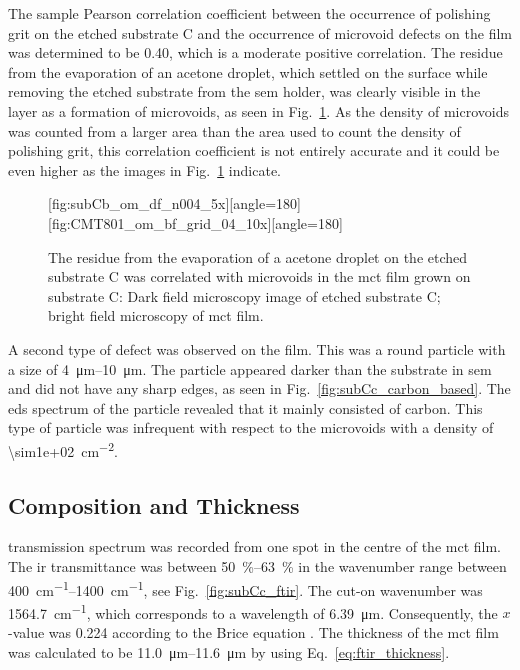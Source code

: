 The sample Pearson correlation coefficient between the occurrence of polishing grit on the etched substrate C and the occurrence of microvoid defects on the film was determined to be \SI{0.40}{}, which is a moderate positive correlation. The residue from the evaporation of an acetone droplet, which settled on the surface while removing the etched substrate from the \ac{sem} holder, was clearly visible in the layer as a formation of microvoids, as seen in Fig.~\ref{fig:subCc_microvoids_correlation}. As the density of microvoids was counted from a larger area than the area used to count the density of polishing grit, this correlation coefficient is not entirely accurate and it could be even higher as the images in Fig.~\ref{fig:subCc_microvoids_correlation} indicate.

\begin{figure}[htbp]
    \centering
    [fig:subCb_om_df_n004_5x][angle=180]
    \hfill
    [fig:CMT801_om_bf_grid_04_10x][angle=180]
    \caption[Residue on etched substrate C visible as microvoids in the film.]{The residue from the evaporation of a acetone droplet on the etched substrate C was correlated with microvoids in the \ac{mct} film grown on substrate C:  Dark field microscopy image of etched substrate C;  bright field microscopy of \ac{mct} film.}\label{fig:subCc_microvoids_correlation}
\end{figure}

A second type of defect was observed on the film. This was a round particle with a size of \SIrange{4}{10}{\micro\metre}. The particle appeared darker than the substrate in \ac{sem} and did not have any sharp edges, as seen in Fig.~\ref{fig:subCc_carbon_based}. The \ac{eds} spectrum of the particle revealed that it mainly consisted of carbon. This type of particle was infrequent with respect to the microvoids with a density of \SI{\sim1e+02}{\centi\metre^{-2}}.

\subsection{Composition and Thickness}

 transmission spectrum was recorded from one spot in the centre of the \ac{mct} film. The \ac{ir} transmittance was between \SIrange{50}{63}{\percent} in the wavenumber range between \SIrange{400}{1400}{\centi\metre^{-1}}, see Fig.~\ref{fig:subCc_ftir}. The cut-on wavenumber was \SI{1564.7}{\centi\metre^{-1}}, which corresponds to a wavelength of \SI{6.39}{\micro\metre}. Consequently, the $x$-value was \SI{0.224}{} according to the Brice equation \citep{brice1975some}. The thickness of the \ac{mct} film was calculated to be \SIrange{11.0}{11.6}{\micro\metre} by using Eq.~\ref{eq:ftir_thickness}.

